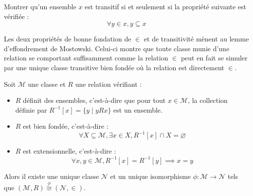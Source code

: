 \begin{exercise}
  Montrer qu'un ensemble $x$ est transitif si et seulement si la propriété
  suivante est vérifiée :
  \[\forall y\in x, y\subseteq x\]
\end{exercise}

Les deux propriétés de bonne fondation de $\in$ et de transitivité mènent au
lemme d'effondrement de Mostowski. Celui-ci montre que toute classe munie d'une
relation se comportant suffisamment comme la relation $\in$ peut en fait se
simuler par une unique classe transitive bien fondée où la relation est
directement $\in$.

\begin{lemma}
  Soit $\mathcal M$ une classe et $R$ une relation vérifiant :
  \begin{itemize}
  \item $R$ définit des ensembles, c'est-à-dire que pour tout $x\in \mathcal M$,
    la collection définie par $R^{-1}[x] = \{y\mid y R x\}$ est un ensemble.
  \item $R$ est bien fondée, c'est-à-dire :
    \[\forall X\subseteq \mathcal M, \exists x \in X, R^{-1}[x]\cap X =
    \varnothing\]
  \item $R$ est extensionnelle, c'est-à-dire :
    \[\forall x,y\in \mathcal M, R^{-1}[x] = R^{-1}[y] \implies x = y\]
  \end{itemize}

  Alors il existe une unique classe $\mathcal N$ et un unique isomorphisme
  $\phi : \mathcal M\to \mathcal N$ tels que
  $(\mathcal M,R) \overset{\phi}{\cong} (\mathcal N,\in)$.
\end{lemma}

